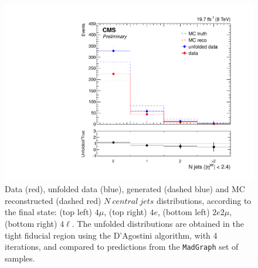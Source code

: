 \begin{figure}[hbtp]
\begin{center}
    \includegraphics[width=\cmsFigWidth]{Figures/CentralJets_ZZTo4l_Mad_fr}    
    \caption{\footnotesize{Data (red), unfolded data (blue), generated (dashed blue) and MC reconstructed (dashed red) $N\ central\ jets$ distributions, according to the final state: (top left) $4\mu$, (top right) $4e$, (bottom left) $2e2\mu$, (bottom right) $4\ell$. The unfolded distributions are obtained in the tight fiducial region using the D'Agostini algorithm, with 4 iterations, and compared to predictions from the \texttt{MadGraph} set of samples.}} 
    \label{fig:CentralJets_unfolding}
  \end{center}
\end{figure}
